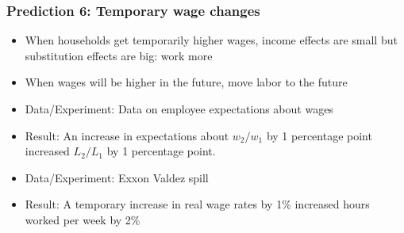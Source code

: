 \documentclass{beamer}
\begin{document}
\begin{frame}
\frametitle{Prediction 6: Temporary wage changes}
\begin{itemize}
\item When households get temporarily higher wages, income effects are small but substitution effects are big: work more
\item When wages will be higher in the future, move labor to the future
\bigskip
\item Data/Experiment:  Data on employee expectations about wages
\bigskip
\item Result:  An increase in expectations about $w_2/w_1$ by 1 percentage point increased $L_2/L_1$ by 1 percentage point.
\bigskip
\item Data/Experiment:  Exxon Valdez spill
\bigskip
\item Result:  A temporary increase in real wage rates by 1\% increased hours worked per week by 2\%
\end{itemize}
\end{frame}
\end{document}
